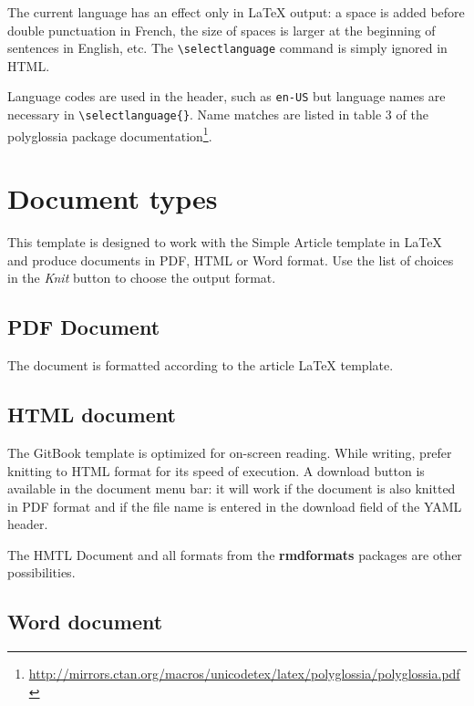 \documentclass[fleqn,]{article} %
\begin{document}
The current language has an effect only in LaTeX output: a space is added before double punctuation in French, the size of spaces is larger at the beginning of sentences in English, etc.
The \texttt{\textbackslash{}selectlanguage} command is simply ignored in HTML.

Language codes are used in the header, such as \texttt{en-US} but language names are necessary in \texttt{\textbackslash{}selectlanguage\{\}}.
Name matches are listed in table 3 of the polyglossia package documentation\footnote{\url{http://mirrors.ctan.org/macros/unicodetex/latex/polyglossia/polyglossia.pdf}}.

\hypertarget{document-types}{%
\section{Document types}\label{document-types}}

This template is designed to work with the Simple Article template in LaTeX and produce documents in PDF, HTML or Word format.
Use the list of choices in the \emph{Knit} button to choose the output format.

\hypertarget{pdf-document}{%
\subsection{PDF Document}\label{pdf-document}}

The document is formatted according to the article LaTeX template.

\hypertarget{html-document}{%
\subsection{HTML document}\label{html-document}}

The GitBook template is optimized for on-screen reading.
While writing, prefer knitting to HTML format for its speed of execution.
A download button is available in the document menu bar: it will work if the document is also knitted in PDF format and if the file name is entered in the download field of the YAML header.

The HMTL Document and all formats from the \textbf{rmdformats} packages are other possibilities.

\hypertarget{word-document}{%
\subsection{Word document}\label{word-document}}
\end{document}
